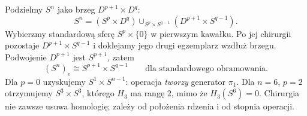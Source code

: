 \begin{przyklad}
\label{prz:sfera-produkt-chirurgia-21}
Podzielmy $S^n$ jako brzeg
$D^{p+1}\times D^q$:
\[
 S^n=(S^p\times D^q)
 \cup_{S^p\times S^{q-1}}
 (D^{p+1}\times S^{q-1}).
\]
Wybierzmy standardową sferę $S^p\times\{0\}$
w pierwszym kawałku. Po jej chirurgii pozostaje
$D^{p+1}\times S^{q-1}$ i doklejamy jego
drugi egzemplarz wzdłuż brzegu.
Podwojenie $D^{p+1}$ jest $S^{p+1}$, zatem
\begin{equation}\label{eq:chirurgia-sfery-21}
 (S^n)_e\cong S^{p+1}\times S^{q-1}
 \qquad\text{dla standardowego obramowania.}
\end{equation}
Dla $p=0$ uzyskujemy $S^1\times S^{n-1}$:
operacja \emph{tworzy} generator $\pi_1$.
Dla $n=6$, $p=2$ otrzymujemy
$S^3\times S^3$, którego $H_3$ ma rangę $2$,
mimo że $H_3(S^6)=0$. Chirurgia nie zawsze
usuwa homologię; zależy od położenia rdzenia
i od stopnia operacji.
\end{przyklad}


